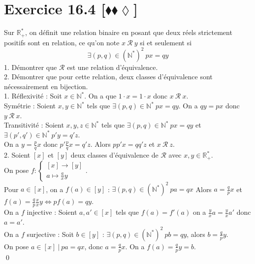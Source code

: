 \documentclass[10pt]{article}
\begin{document}
\section*{Exercice 16.4 [$\blacklozenge\blacklozenge\lozenge$]}
\begin{tcolorbox}[enhanced, width=7.6in, center, size=fbox, fontupper=\large, drop shadow southwest]
    Sur $\mathbb{R}^*_+$, on définit une relation binaire en posant que deux réels strictement positifs sont en relation, ce qu'on note $x~\mathcal{R}~y$ si et seulement si
    \begin{equation*}
        \exists(p,q)\in(\mathbb{N}^*)^2 ~ px = qy
    \end{equation*}
    1. Démontrer que $\mathcal{R}$ est une relation d'équivalence.\\
    2. Démontrer que pour cette relation, deux classes d'équivalence sont nécessairement en bijection.\\[0.2cm]
    1. Réflexivité : Soit $x\in\mathbb{N}^*$. On a que $1\cdot x = 1\cdot x$ donc $x ~ \mathcal{R} ~ x$.\\
    Symétrie : Soient $x,y\in\mathbb{N}^*$ tels que $\exists(p,q)\in\mathbb{N}^* ~ px = qy$. On a $qy = px$ donc $y ~ \mathcal{R} ~ x$.\\
    Transitivité : Soient $x,y,z\in\mathbb{N}^*$ tels que $\exists(p,q)\in\mathbb{N}^*~px=qy$ et $\exists(p',q')\in\mathbb{N}^*~p'y=q'z$.\\
    On a $y=\frac{p}{q}x$ donc $p'\frac{p}{q}x=q'z$. Alors $pp'x=qq'z$ et $x~\mathcal{R}~z$.\\[0.15cm]
    2. Soient $[x]$ et $[y]$ deux classes d'équivalence de $\mathcal{R}$ avec $x,y\in\mathbb{R}^*_+$.\\
    On pose $f:\begin{cases}
        [x] \to [y]\\
        a\mapsto \frac{a}{x}y
    \end{cases}$.\\
    Pour $a\in[x]$, on a $f(a)\in[y]$ : $\exists (p,q)\in(\mathbb{N}^*)^2 ~ pa = qx$ Alors $a=\frac{q}{p}x$ et $f(a)=\frac{q}{p}\frac{x}{x}y \iff pf(a)=qy$.\\
    On a $f$ injective : Soient $a,a'\in[x]$ tels que $f(a)=f'(a)$ on a $\frac{y}{x}a=\frac{y}{x}a'$ donc $a=a'$.\\
    On a $f$ surjective : Soit $b\in[y]$ : $\exists(p,q)\in(\mathbb{N}^*)^2 ~ pb = qy$, alors $b=\frac{q}{p}y$.\\
    On pose $a\in[x] ~ | ~ pa=qx$, donc $a=\frac{q}{p}x$. On a $f(a)=\frac{q}{p}y=b$.\\
    \qed
\end{tcolorbox}
\end{document}
